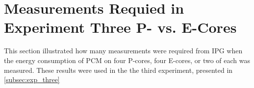 \section*{Measurements Requied in Experiment Three P- vs. E-Cores}\label{app:p-vs-e}

This section illustrated how many measurements were required from IPG when the energy consumption of PCM on four P-cores, four E-cores, or two of each was measured. These results were used in the the third experiment, presented in \cref{subsec:exp_three}





% 
% 
% 
% 